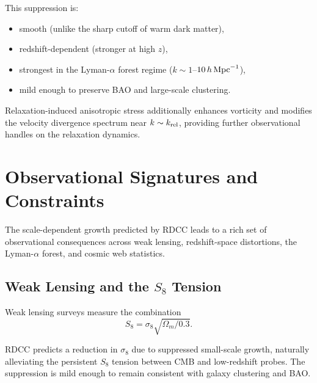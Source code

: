\documentclass[11pt,a4paper]{article}
\begin{document}
This suppression is:
\begin{itemize}
\item smooth (unlike the sharp cutoff of warm dark matter),
\item redshift-dependent (stronger at high $z$),
\item strongest in the Lyman-$\alpha$ forest regime ($k \sim 1$–$10\,h\,{\rm Mpc}^{-1}$),
\item mild enough to preserve BAO and large-scale clustering.
\end{itemize}

Relaxation-induced anisotropic stress additionally enhances vorticity and modifies the
velocity divergence spectrum near $k \sim k_{\rm rel}$, providing further observational
handles on the relaxation dynamics.

\section{Observational Signatures and Constraints}

The scale-dependent growth predicted by RDCC leads to a rich set of observational
consequences across weak lensing, redshift-space distortions, the Lyman-$\alpha$ forest,
and cosmic web statistics.

\subsection{Weak Lensing and the \texorpdfstring{\(S_8\)}{S8} Tension}

Weak lensing surveys measure the combination
\begin{equation}
S_8 = \sigma_8 \sqrt{\Omega_m/0.3}.
\end{equation}

RDCC predicts a reduction in $\sigma_8$ due to suppressed small-scale growth, naturally
alleviating the persistent $S_8$ tension between CMB and low-redshift probes. The
suppression is mild enough to remain consistent with galaxy clustering and BAO.

\end{document}
